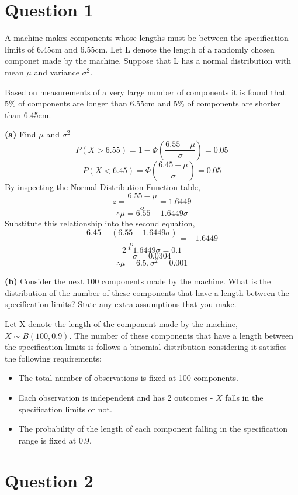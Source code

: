 \documentclass[
]{book}
\providecommand{\tightlist}{%
  \setlength{\itemsep}{0pt}\setlength{\parskip}{0pt}}
\begin{document}
\section{Question 1}\label{question-1-4}

A machine makes components whose lengths must be between the specification limits of 6.45cm and 6.55cm. Let L denote the length of a randomly chosen componet made by the machine. Suppose that L has a normal distribution with mean \(\mu\) and variance \(\sigma^2\).

Based on measurements of a very large number of components it is found that \(5\%\) of components are longer than 6.55cm and \(5\%\) of components are shorter than 6.45cm.

\textbf{(a)} Find \(\mu\) and \(\sigma^2\)
\[P(X > 6.55) = 1 - \Phi(\frac{6.55 - \mu}{\sigma}) = 0.05\]
\[P(X < 6.45) = \Phi(\frac{6.45 - \mu}{\sigma}) = 0.05\]
By inspecting the Normal Distribution Function table,
\[z = \frac{6.55 - \mu}{\sigma} = 1.6449\]
\[\therefore \mu = 6.55 - 1.6449 \sigma\]
Substitute this relationship into the second equation,
\[\frac{6.45 - (6.55 - 1.6449 \sigma)}{\sigma} = -1.6449\]
\[2 * 1.6449 \sigma = 0.1\]
\[\sigma = 0.0304\]
\[\therefore \mu = 6.5, \sigma^2 = 0.001\]

\textbf{(b)} Consider the next 100 components made by the machine. What is the distribution of the number of these components that have a length between the specification limits? State any extra assumptions that you make.

Let X denote the length of the component made by the machine, \(X \sim B(100, 0.9)\). The number of these components that have a length between the specification limits is follows a binomial distribution considering it satisfies the following requirements:

\begin{itemize}
\tightlist
\item
  The total number of observations is fixed at 100 components.
\item
  Each observation is independent and has 2 outcomes - \(X\) falls in the specification limits or not.
\item
  The probability of the length of each component falling in the specification range is fixed at \(0.9\).
\end{itemize}

\section{Question 2}\label{question-2-4}
\end{document}
